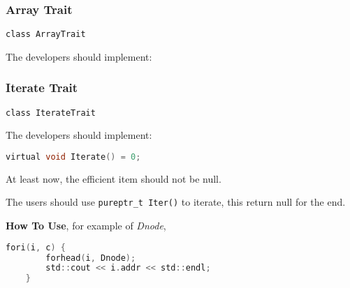 

\subsubsection{Array Trait}

\verb|class ArrayTrait|

The developers should implement:

\lstset{style=GlobalCxx}

\subsubsection{Iterate Trait}

\verb|class IterateTrait|

The developers should implement:

\lstset{style=GlobalC}
\begin{lstlisting}[language=C]
	virtual void Iterate() = 0;
\end{lstlisting}

At least now, the efficient item should not be null.

The users should use \verb|pureptr_t Iter()| to iterate, this return null for the end.

\textbf{How To Use}, for example of \textit{Dnode},

\lstset{style=GlobalC}
\begin{lstlisting}[language=C]
	fori(i, c) {
		forhead(i, Dnode);
		std::cout << i.addr << std::endl;
	}
\end{lstlisting}
